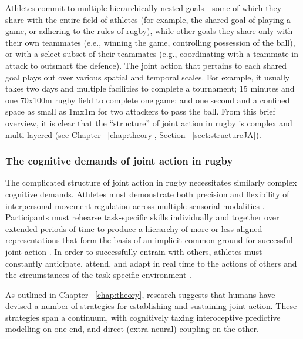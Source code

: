 \begin{CJK}{UTF8}{gbsn}
Athletes commit to multiple hierarchically nested goals---some of which they share with the entire field of athletes (for example, the shared goal of playing a game, or adhering to the rules of rugby), while other goals they share only with their own teammates (e.e., winning the game, controlling possession of the ball), or with a select subset of their teammates (e.g., coordinating with a teammate in attack to outsmart the defence).  The joint action that pertains to each shared goal plays out over various spatial and temporal scales.  For example, it usually takes two days and multiple facilities to complete a tournament; 15 minutes and one 70x100m rugby field to complete one game; and one second and a confined space as small as 1mx1m for two attackers to pass the ball.  From this brief overview, it is clear that the ``structure'' of joint action in rugby is complex and multi-layered (see Chapter ~\ref{chap:theory}, Section ~\ref{sect:structureJA}).






\subsubsection{The cognitive demands of joint action in rugby}

The complicated structure of joint action in rugby necessitates similarly complex cognitive demands.  Athletes must demonstrate both precision and flexibility of interpersonal movement regulation across multiple sensorial modalities \citep{Keller2014}.  Participants must rehearse task-specific skills individually and together over extended periods of time to produce a hierarchy of more or less aligned representations that form the basis of an implicit common ground for successful joint action \citep{Noy2017}.  In order to successfully entrain with others, athletes must constantly anticipate, attend, and adapt in real time to the actions of others and the circumstances of the task-specific environment \citep{Vesper2017}.

As outlined in Chapter ~\ref{chap:theory}, research suggests that humans have devised a number of strategies for establishing and sustaining joint action.  These strategies span a continuum, with cognitively taxing interoceptive predictive modelling on one end, and direct (extra-neural) coupling on the other.




\end{CJK}
